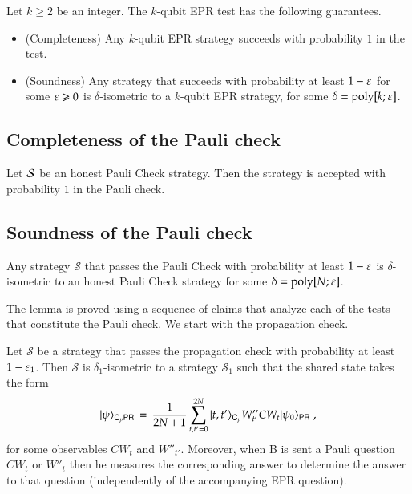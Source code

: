\begin{theorem}\label{thm:epr-test}
Let $k \geq 2$ be an integer. The $k$-qubit EPR test has the following guarantees. 
\begin{itemize}
\item (Completeness) Any $k$-qubit EPR strategy succeeds with probability $1$ in the test. 
\item (Soundness) Any strategy that succeeds with probability at least $1-\varepsilon$ for some $\varepsilon\geqslant 0$ is $\delta$-isometric to a $k$-qubit EPR strategy, for some $\delta = \operatorname{poly}[k;\varepsilon]$. 
\end{itemize}
\end{theorem}

\subsection{Completeness of the Pauli check}

\begin{lemma}\label{lem:paulicheck-compleness}
Let $\mathcal{S}$ be an honest Pauli Check strategy. Then the strategy is accepted with probability $1$ in the Pauli check.
\end{lemma}


\subsection{Soundness of the Pauli check}

\begin{lemma}\label{lem:paulicheck-soundness}
Any strategy $\mathcal{S}$ that passes the Pauli Check with probability at least $1 - \varepsilon$ is $\delta$-isometric to an honest Pauli Check strategy for some $\delta = \operatorname{poly}[N;\varepsilon]$.
\end{lemma}

The lemma is proved using a sequence of claims that analyze each of the tests that constitute the Pauli check. We start with the propagation check. 

\begin{claim}\label{claim:pauli-prop}
Let $\mathcal{S}$ be a strategy that passes the propagation check with probability at least $1 - \varepsilon_1$. Then $\mathcal{S}$ is $\delta_1$-isometric to a strategy $\mathcal{S}_1$ such that the shared state takes the form
\[ |\psi\rangle_{{\textsf{C}}_p {\textsf{PR}}} \,=\, \frac{1}{2N+1} \sum_{t,t'=0}^{2N} |t,t'\rangle_{{\textsf{C}}_p} W''_{t'} CW_t | \psi_0\rangle_{{\textsf{PR}}}\;, \]
for some observables $CW_t$ and $W''_{t'}$. Moreover, when B is sent a Pauli question $CW_t$ or $W''_t$ then he measures the corresponding answer to determine the answer to that question (independently of the accompanying EPR question). 
\end{claim}

